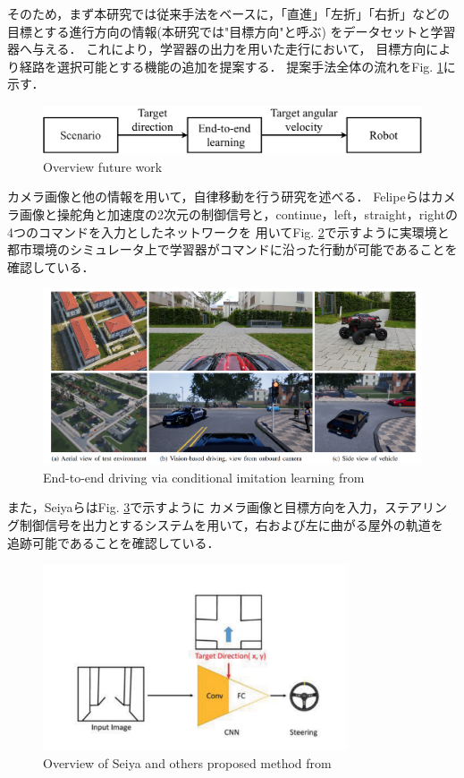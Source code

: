 そのため，まず本研究では従来手法をベースに，「直進」「左折」「右折」などの
目標とする進行方向の情報(本研究では"目標方向"と呼ぶ)
をデータセットと学習器へ与える．
これにより，学習器の出力を用いた走行において，
目標方向により経路を選択可能とする機能の追加を提案する．
提案手法全体の流れをFig. \ref{fig::haikei_zentai}に示す．
\begin{figure}[H]
    \centering
    \includegraphics[width = 13cm]{./figs/haikei_zentai.pdf}
    \caption{Overview future work}
    \label{fig::haikei_zentai}
\end{figure}

\newpage
カメラ画像と他の情報を用いて，自律移動を行う研究を述べる．
Felipeら\cite{razikon}はカメラ画像と操舵角と加速度の2次元の制御信号と，continue，left，straight，rightの4つのコマンドを入力としたネットワークを
用いてFig. \ref{fig::Conditional_Imitation_Learning}で示すように実環境と都市環境のシミュレータ上で学習器がコマンドに沿った行動が可能であることを
確認している．
\begin{figure}[H]
    \centering
    \includegraphics[width = 12cm]{./figs/End-to-end_Driving_via_Conditional_Imitation_Learning.pdf}
    \caption{End-to-end  driving  via  conditional  imitation  learning from \cite{razikon}}
    \label{fig::Conditional_Imitation_Learning}
\end{figure}

また，Seiyaら\cite{nagoya}はFig. \ref{fig::nagoyaabst}で示すように
カメラ画像と目標方向を入力，ステアリング制御信号を出力とするシステムを用いて，右および左に曲がる屋外の軌道を
追跡可能であることを確認している．

\begin{figure}[H]
    \centering
    \includegraphics[width = 9cm]{./figs/End-to-End_Navigation_with_Branch_Turning_Support_using_Convolutional_Neural_Network_abst.pdf}
    \caption{Overview of Seiya and others proposed method from \cite{nagoya}}
    \label{fig::nagoyaabst}
\end{figure}



